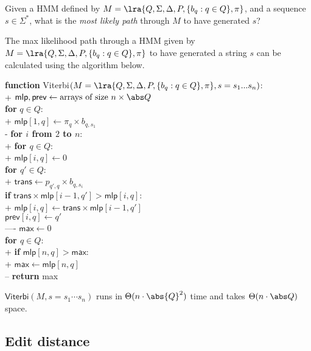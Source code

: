 \documentclass{article}
\begin{document}
\begin{definition}
	Given a HMM defined by $M=\lra{Q,\Sigma,\Delta,P,\{b_q:q\in Q\},\pi}$, and
	a sequence $s\in\Sigma^*$, what is the \emph{most likely path} through $M$
	to have generated $s$?	
\end{definition}

\begin{theorem}[L19]
	The max likelihood path through a HMM given by $M=\lra{Q,\Sigma,\Delta,
	P,\{b_q:q\in Q\},\pi}$ to have generated a string $s$ can be calculated 
	using the algorithm below.
	\begin{pseudo}
		\textbf{function} \textsf{Viterbi}$(M=\lra{Q,\Sigma,\Delta, P,
			\{b_q:q\in Q\},\pi}, s=s_1...s_n)$:									\\+
			$\textsf{mlp}, \textsf{prev}
				\leftarrow \text{arrays of size $n\times\abs Q$}$				\\
			\textbf{for} $q\in Q$:												\\+
				$\textsf{mlp}[1,q]\leftarrow\pi_q\times b_{q,s_1}$				\\-
			\textbf{for $i$ from $2$ to $n$}:									\\+
				\textbf{for $q\in Q$}:											\\+
					$\textsf{mlp}[i,q]\leftarrow 0$								\\
					\textbf{for $q'\in Q$}:										\\+
						$\textsf{trans}\leftarrow p_{q',q}\times b_{q,s_i}$	\\
						\textbf{if} $\textsf{trans}\times\textsf{mlp}[i-1,q']>
							\textsf{mlp}[i,q]$:									\\+
							$\textsf{mlp}[i,q]\leftarrow
								\textsf{trans}\times\textsf{mlp}[i-1,q']$		\\
							$\textsf{prev}[i,q]\leftarrow q'$					\\----
			$\textsf{max}\leftarrow 0$											\\
			\textbf{for $q\in Q$}:												\\+
				\textbf{if} $\textsf{mlp}[n,q]>\textsf{max}$:					\\+
					$\textsf{max}\leftarrow\textsf{mlp}[n,q]$					\\--
			\textbf{return} \textsf{max}
	\end{pseudo}
	$\textsf{Viterbi}(M, s=s_1\cdots s_n)$ runs in $\Theta(n\cdot\abs{Q}^2)$ time
	and takes $\Theta(n\cdot\abs Q)$ space.
\end{theorem}

\subsection{Edit distance}
\end{document}
